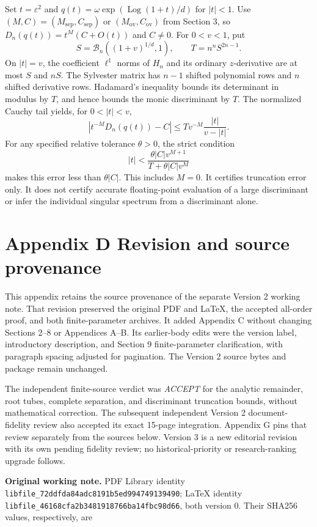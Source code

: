 \documentclass[
  11pt,
]{article}
\begin{document}
Set \(t=\varepsilon^2\) and
\(q(t)=\omega\exp(\operatorname{Log}(1+t)/d)\) for \(|t|<1\).
Use \((M,C)=(M_{\mathrm{sep}},C_{\mathrm{sep}})\) or
\((M_{\mathrm{ov}},C_{\mathrm{ov}})\) from Section 3, so
\(D_n(q(t))=t^M(C+O(t))\) and \(C\ne0\). For \(0<v<1\), put
\[
S=\mathcal B_n((1+v)^{1/d},1),\qquad T=n^nS^{2n-1}.
\]
On \(|t|=v\), the coefficient \(\ell^1\) norms of \(H_n\) and
its ordinary \(z\)-derivative are at most \(S\) and \(nS\).
The Sylvester matrix has \(n-1\) shifted polynomial rows and \(n\)
shifted derivative rows. Hadamard's inequality bounds its determinant
in modulus by \(T\), and hence bounds the monic discriminant by
\(T\). The normalized Cauchy tail yields, for \(0<|t|<v\),
\[
|t^{-M}D_n(q(t))-C|\leq T v^{-M}\frac{|t|}{v-|t|}. \tag{C16}
\]
For any specified relative tolerance \(\theta>0\), the strict condition
\[
|t|<\frac{\theta|C|v^{M+1}}{T+\theta|C|v^M} \tag{C17}
\]
makes this error less than \(\theta|C|\). This includes \(M=0\).
It certifies truncation error only. It does not certify accurate
floating-point evaluation of a large discriminant or infer the
individual singular spectrum from a discriminant alone.

\clearpage
\section{Appendix D Revision and source provenance}

This appendix retains the source provenance of the separate Version 2
working note. That revision preserved the original PDF and LaTeX, the
accepted all-order proof, and both finite-parameter archives. It added
Appendix C without changing Sections 2--8 or Appendices A--B. Its earlier-body
edits were the version label, introductory description, and Section 9
finite-parameter clarification, with paragraph spacing adjusted for
pagination. The Version 2 source bytes and package remain unchanged.

The independent finite-source verdict was \emph{ACCEPT} for the analytic
remainder, root tubes, complete separation, and discriminant truncation
bounds, without mathematical correction. The subsequent independent
Version 2 document-fidelity review also accepted its exact 15-page
integration. Appendix G pins that review separately from the sources
below. Version 3 is a new editorial revision with its own pending fidelity
review; no historical-priority or research-ranking upgrade follows.

\textbf{Original working note.} PDF Library identity
\nolinkurl{libfile_72ddfda84adc8191b5ed994749139490}; LaTeX identity
\nolinkurl{libfile_46168cfa2b3481918766ba14fbc98d66}, both version 0.
Their SHA256 values, respectively, are
\end{document}

